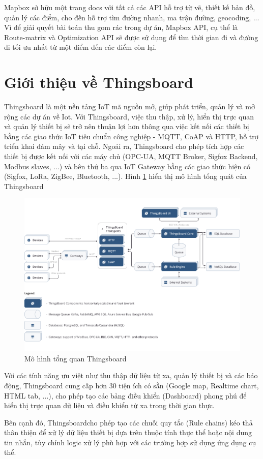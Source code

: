 Mapbox sở hữu một trang docs với tất cả các API hỗ trợ từ vẽ, thiết kế bản đồ, quản lý các điểm, cho đến hỗ trợ tìm đường nhanh, ma trận đường, geocoding, ... Vì để giải quyết bài toán thu gom rác trong dự án, Mapbox API, cụ thể là Route-matrix và Optimization API sẽ được sử dụng để tìm thời gian đi và đường đi tối ưu nhất từ một điểm đến các điểm còn lại. 

\section{Giới thiệu về Thingsboard}
Thingsboard là một nền tảng IoT mã nguồn mở, giúp phát triển, quản lý và mở rộng các dự án về Iot. Với Thingsboard, việc thu thập, xử lý, hiển thị trực quan và quản lý thiết bị sẽ trở nên thuận lợi hơn thông qua việc kết nối các thiết bị bằng các giao thức IoT tiêu chuẩn công nghiệp - MQTT, CoAP và HTTP, hỗ trợ triển khai đám mây và tại chỗ. Ngoải ra, Thingsboard cho phép tích hợp các thiết bị được kết nối với các máy chủ (OPC-UA, MQTT Broker, Sigfox Backend, Modbus slaves, ...) và bên thứ ba qua IoT Gateway bằng các giao thức hiện có (Sigfox, LoRa, ZigBee, Bluetooth, ...). Hình \ref{fig:thingsboard_overall} hiển thị mô hình tổng quát của Thingsboard

\begin{figure}[h]
    \centering
    \includegraphics[width=\textwidth]{images/Khanh/Thingsboard/thingsboard_overall.png}
    \caption{Mô hình tổng quan Thingsboard \cite{thingsboard}}
    \label{fig:thingsboard_overall}
\end{figure}

Với các tính năng ưu việt như thu thập dữ liệu từ xa, quản lý thiết bị và các báo động, Thingsboard cung cấp hơn 30 tiện ích có sẵn (Google map, Realtime chart, HTML tab, ...), cho phép tạo các bảng điều khiển (Dashboard) phong phú để hiển thị trực quan dữ liệu và điều khiển từ xa trong thời gian thực.

Bên cạnh đó, Thingsboardcho phép tạo các chuỗi quy tắc (Rule chains) kéo thả thân thiện để xử lý dữ liệu thiết bị dựa trên thuộc tính thực thể hoặc nội dung tin nhắn, tùy chỉnh logic xử lý phù hợp với các trường hợp sử dụng ứng dụng cụ thể. 


